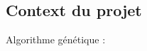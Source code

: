 

\subsection{Context du projet}\label{subsec:context-du-projet}

Algorithme génétique : \cite{burke1994genetic}